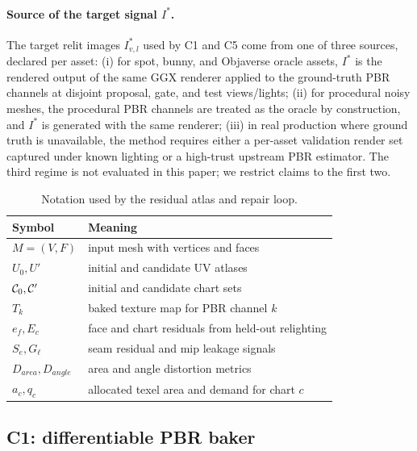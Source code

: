 \paragraph*{Source of the target signal $I^*$.}
The target relit images $I^*_{v,l}$ used by C1 and C5 come from one of three sources, declared per asset: (i) for spot, bunny, and Objaverse oracle assets, $I^*$ is the rendered output of the same GGX renderer applied to the ground-truth PBR channels at disjoint proposal, gate, and test views/lights; (ii) for procedural noisy meshes, the procedural PBR channels are treated as the oracle by construction, and $I^*$ is generated with the same renderer; (iii) in real production where ground truth is unavailable, the method requires either a per-asset validation render set captured under known lighting or a high-trust upstream PBR estimator. The third regime is not evaluated in this paper; we restrict claims to the first two.

\begin{table}[t]
\centering
\scriptsize
\caption{Notation used by the residual atlas and repair loop.}
\label{tab:notation}
\begin{tabular}{@{}ll@{}}
\toprule
Symbol & Meaning \\
\midrule
\(M=(V,F)\) & input mesh with vertices and faces \\
\(U_0,U'\) & initial and candidate UV atlases \\
\(\mathcal{C}_0,\mathcal{C}'\) & initial and candidate chart sets \\
\(T_k\) & baked texture map for PBR channel \(k\) \\
\(e_f,E_c\) & face and chart residuals from held-out relighting \\
\(S_e,G_\ell\) & seam residual and mip leakage signals \\
\(D_{area},D_{angle}\) & area and angle distortion metrics \\
\(a_c,q_c\) & allocated texel area and demand for chart \(c\) \\
\bottomrule
\end{tabular}
\end{table}

\subsection{C1: differentiable PBR baker}
\label{sec:c1}

